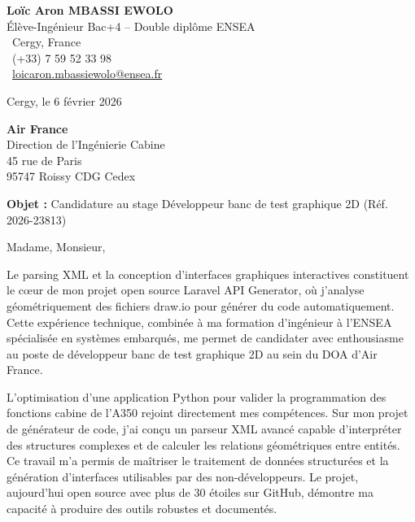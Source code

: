 \documentclass[a4paper,11pt]{article}
\begin{document}
\noindent
\begin{minipage}[t]{0.5\textwidth}
    \textbf{Loïc Aron MBASSI EWOLO}\\
    Élève-Ingénieur Bac+4 -- Double diplôme ENSEA\\[3pt]
    \faMapMarker\ Cergy, France\\
    \faPhone\ (+33) 7 59 52 33 98\\
    \faEnvelope\ \href{mailto:loicaron.mbassiewolo@ensea.fr}{loicaron.mbassiewolo@ensea.fr}
\end{minipage}
\hfill
\begin{minipage}[t]{0.4\textwidth}
    \raggedleft
    Cergy, le 6 février 2026
\end{minipage}

\vspace{1.2cm}

\hfill
\begin{minipage}[t]{0.5\textwidth}
    \raggedleft
    \textbf{Air France}\\
    Direction de l'Ingénierie Cabine\\
    45 rue de Paris\\
    95747 Roissy CDG Cedex
\end{minipage}

\vspace{1cm}

\noindent\textbf{Objet :} Candidature au stage Développeur banc de test graphique 2D (Réf. 2026-23813)

\vspace{0.8cm}

Madame, Monsieur,

Le parsing XML et la conception d'interfaces graphiques interactives constituent le cœur de mon projet open source Laravel API Generator, où j'analyse géométriquement des fichiers draw.io pour générer du code automatiquement. Cette expérience technique, combinée à ma formation d'ingénieur à l'ENSEA spécialisée en systèmes embarqués, me permet de candidater avec enthousiasme au poste de développeur banc de test graphique 2D au sein du DOA d'Air France.

L'optimisation d'une application Python pour valider la programmation des fonctions cabine de l'A350 rejoint directement mes compétences. Sur mon projet de générateur de code, j'ai conçu un parseur XML avancé capable d'interpréter des structures complexes et de calculer les relations géométriques entre entités. Ce travail m'a permis de maîtriser le traitement de données structurées et la génération d'interfaces utilisables par des non-développeurs. Le projet, aujourd'hui open source avec plus de 30 étoiles sur GitHub, démontre ma capacité à produire des outils robustes et documentés.
\end{document}
